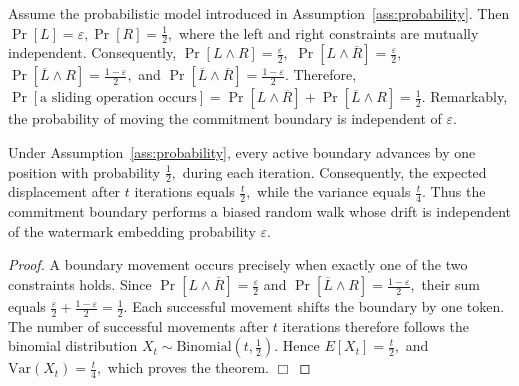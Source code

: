 \documentclass[a4paper,11pt]{llncs}
\begin{document}

Assume the probabilistic model introduced in
Assumption~\ref{ass:probability}. Then
$
\Pr[L]=\varepsilon,
\Pr[R]=\frac12,
$
where the left and right constraints are mutually independent.
Consequently,
$
\Pr[L\wedge R]
=
\frac{\varepsilon}{2},
$
$
\Pr[L\wedge\overline{R}]
=
\frac{\varepsilon}{2},
$
$
\Pr[\overline{L}\wedge R]
=
\frac{1-\varepsilon}{2},
$
and
$
\Pr[\overline{L}\wedge\overline{R}]
=
\frac{1-\varepsilon}{2}.
$
Therefore,
$
\Pr[\text{a sliding operation occurs}]
=
\Pr[L\wedge\overline{R}]
+
\Pr[\overline{L}\wedge R]
=
\frac12.
$
Remarkably, the probability of moving the commitment boundary is
independent of $\varepsilon$.
%
\begin{theorem}
Under Assumption~\ref{ass:probability}, every active boundary advances by one position with
probability
$
\frac12,
$
during each iteration. Consequently, the expected displacement after
$t$ iterations equals
$
\frac{t}{2},
$
while the variance equals
$
\frac{t}{4}.
$
Thus the commitment boundary performs a biased random walk whose drift
is independent of the watermark embedding probability
$\varepsilon$.
\end{theorem}

\begin{proof}
A boundary movement occurs precisely when exactly one of the two
constraints holds.
Since
$
\Pr[L\wedge\overline{R}]
=
\frac{\varepsilon}{2}
$
and
$
\Pr[\overline{L}\wedge R]
=
\frac{1-\varepsilon}{2},
$
their sum equals
$
\frac{\varepsilon}{2}
+
\frac{1-\varepsilon}{2}
=
\frac12.
$
Each successful movement shifts the boundary by one token.
The number of successful movements after $t$ iterations therefore
follows the binomial distribution
$
X_t\sim\mathrm{Binomial}
\left(
t,\frac12
\right).
$
Hence
$
E[X_t]
=
\frac{t}{2},
$
and
$
\mathrm{Var}(X_t)
=
\frac{t}{4},
$
which proves the theorem.
\hfill$\Box$
\end{proof}

\end{document}
